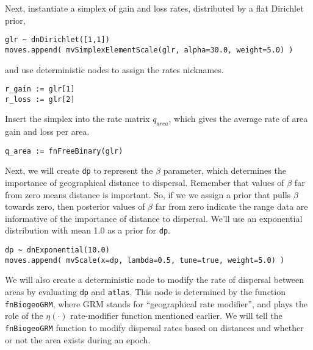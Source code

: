 Next, instantiate a simplex of gain and loss rates, distributed by a flat Dirichlet prior,

\begin{snugshade}
\begin{lstlisting}
glr ~ dnDirichlet([1,1])
moves.append( mvSimplexElementScale(glr, alpha=30.0, weight=5.0) )
\end{lstlisting}
\end{snugshade}

and use deterministic nodes to assign the rates nicknames.

\begin{snugshade}
\begin{lstlisting}
r_gain := glr[1]
r_loss := glr[2]
\end{lstlisting}
\end{snugshade}

Insert the simplex into the rate matrix {\tt $q_{area}$}, which gives the average rate of area gain and loss per area.

\begin{snugshade}
\begin{lstlisting}
q_area := fnFreeBinary(glr)
\end{lstlisting}
\end{snugshade}

Next, we will create {\tt dp} to represent the $\beta$ parameter, which determines the importance of geographical distance to dispersal.
Remember that values of $\beta$ far from zero means distance is important.
So, if we we assign a prior that pulls $\beta$ towards zero, then posterior values of $\beta$ far from zero indicate the range data are informative of the importance of distance to dispersal.
We'll use an exponential distribution with mean 1.0 as a prior for {\tt dp}.

\begin{snugshade}
\begin{lstlisting}
dp ~ dnExponential(10.0)
moves.append( mvScale(x=dp, lambda=0.5, tune=true, weight=5.0) )
\end{lstlisting}
\end{snugshade}

We will also create a deterministic node to modify the rate of dispersal between areas by evaluating {\tt dp} and {\tt atlas}.
This node is determined by the function {\tt fnBiogeoGRM}, where GRM stands for ``geographical rate modifier'', and plays the role of the $\eta(\cdot)$ rate-modifier function mentioned earlier.
We will tell the {\tt fnBiogeoGRM} function to modify dispersal rates based on distances and whether or not the area exists during an epoch.

